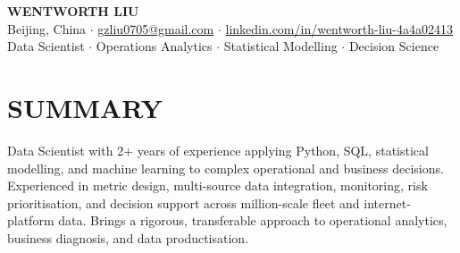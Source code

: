 \documentclass[a4paper,10pt]{article}
\begin{document}
\begin{center}
    {\Large\bfseries WENTWORTH LIU}\\[2pt]
    {\small Beijing, China \;$\cdot$\; \href{mailto:gzliu0705@gmail.com}{gzliu0705@gmail.com} \;$\cdot$\; \href{https://www.linkedin.com/in/wentworth-liu-4a4a02413/}{linkedin.com/in/wentworth-liu-4a4a02413}}\\[2pt]
    {\small Data Scientist \;$\cdot$\; Operations Analytics \;$\cdot$\; Statistical Modelling \;$\cdot$\; Decision Science}
\end{center}
\vspace{-3pt}

\section{SUMMARY}
Data Scientist with 2+ years of experience applying Python, SQL, statistical modelling, and machine learning to complex operational and business decisions. Experienced in metric design, multi-source data integration, monitoring, risk prioritisation, and decision support across million-scale fleet and internet-platform data. Brings a rigorous, transferable approach to operational analytics, business diagnosis, and data productisation.
\end{document}
